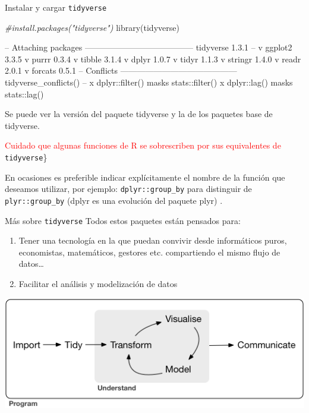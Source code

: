 \documentclass[
  ignorenonframetext,
  aspectratio=169]{beamer}
\newenvironment{Shaded}{\begin{snugshade}}{\end{snugshade}}
\newcommand{\CommentTok}[1]{\textcolor[rgb]{0.56,0.35,0.01}{\textit{#1}}}
\newcommand{\FunctionTok}[1]{\textcolor[rgb]{0.00,0.00,0.00}{#1}}
\newcommand{\NormalTok}[1]{#1}
\let\oldverbatim\verbatim
\let\endoldverbatim\endverbatim
\renewenvironment{verbatim}{\tiny\oldverbatim}{\endoldverbatim}
\newcommand\red[1]{\textcolor{red}{#1}}
\begin{document}
\begin{frame}[fragile]{Instalar y cargar \texttt{tidyverse}}
\protect\hypertarget{instalar-y-cargar-tidyverse}{}
\begin{Shaded}
\begin{Highlighting}[]
\CommentTok{\#install.packages("tidyverse")}
\FunctionTok{library}\NormalTok{(tidyverse)}
\end{Highlighting}
\end{Shaded}

\begin{verbatim}
-- Attaching packages --------------------------------------- tidyverse 1.3.1 --
v ggplot2 3.3.5 v purrr 0.3.4
v tibble 3.1.4 v dplyr 1.0.7
v tidyr 1.1.3 v stringr 1.4.0
v readr 2.0.1 v forcats 0.5.1
-- Conflicts ------------------------------------------ tidyverse_conflicts() --
x dplyr::filter() masks stats::filter()
x dplyr::lag() masks stats::lag()
\end{verbatim}

Se puede ver la versión del paquete tidyverse y la de los paquetes base
de tidyverse.

\red{Cuidado que algunas funciones de R se sobrescriben por sus equivalentes de}
\texttt{tidyverse}\}

En ocasiones es preferible indicar explícitamente el nombre de la
función que deseamos utilizar, por ejemplo: \texttt{dplyr::group\_by}
para distinguir de \texttt{plyr::group\_by} (dplyr es una evolución del
paquete plyr) .
\end{frame}

\begin{frame}{Más sobre \texttt{tidyverse}}
\protect\hypertarget{muxe1s-sobre-tidyverse}{}
Todos estos paquetes están pensados para:

\begin{enumerate}
\item
  Tener una tecnología en la que puedan convivir desde informáticos
  puros, economistas, matemáticos, gestores etc. compartiendo el mismo
  flujo de datos\ldots{}
\item
  Facilitar el análisis y modelización de datos
\end{enumerate}

\begin{center}\includegraphics[width=0.6\linewidth]{Imgs/data-science} \end{center}
\end{frame}
\end{document}
